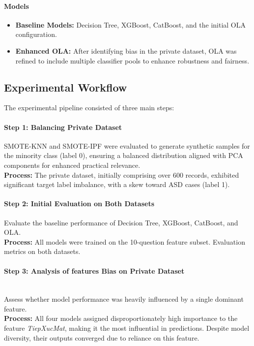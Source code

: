\documentclass[conference]{IEEEtran}
\begin{document}
\paragraph{\textbf{Models}}
\begin{itemize}
\item \textbf{Baseline Models:} Decision Tree, XGBoost, CatBoost, and the initial OLA configuration.
\item \textbf{Enhanced OLA:} After identifying bias in the private dataset, OLA was refined to include multiple classifier pools to enhance robustness and fairness.\\

\end{itemize}

\subsection{Experimental Workflow}
The experimental pipeline consisted of three main steps:
\paragraph{\textbf{Step 1: Balancing Private Dataset}}

SMOTE-KNN and SMOTE-IPF were evaluated to generate synthetic samples for the minority class (label 0), ensuring a balanced distribution aligned with PCA components for enhanced practical relevance.\\
\textbf{Process:} The private dataset, initially comprising over 600 records, exhibited significant target label imbalance, with a skew toward ASD cases (label 1). 

\paragraph{\textbf{Step 2: Initial Evaluation on Both Datasets}}

Evaluate the baseline performance of Decision Tree, XGBoost, CatBoost, and OLA.\\
\textbf{Process:} All models were trained on the 10-question feature subset. Evaluation metrics on both datasets.

\paragraph{\textbf{Step 3: Analysis of features Bias on Private Dataset}}\\

Assess whether model performance was heavily influenced by a single dominant feature.\\
\textbf{Process:} All four models assigned disproportionately high importance to the feature \textit{TiepXucMat}, making it the most influential in predictions. Despite model diversity, their outputs converged due to reliance on this feature.
\end{document}

